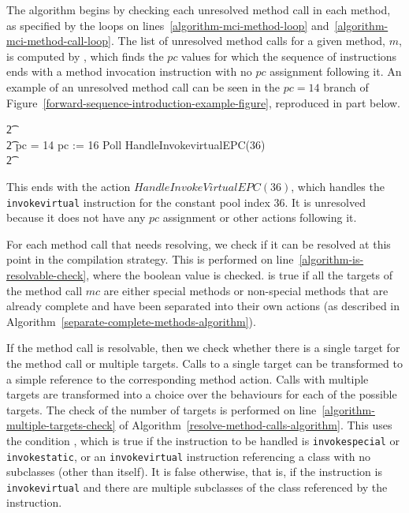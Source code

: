 The algorithm begins by checking each unresolved method call in each
method, as specified by the loops on
lines~\ref{algorithm-mci-method-loop}
and~\ref{algorithm-mci-method-call-loop}.
The list of unresolved method calls for a given method, $m$, is
computed by , which finds the $pc$
values for which the sequence of instructions ends with a method
invocation instruction with no $pc$ assignment following it.
An example of an unresolved method call can be seen in the $pc = 14$
branch of Figure~\ref{forward-sequence-introduction-example-figure},
reproduced in part below.
\begin{circusaction}
  \t2 {} \cdots {} \\
  \t2 {} \circelse pc = 14 \circthen \cdots \circseq pc := 16 \circseq Poll \circseq HandleInvokevirtualEPC(36) \\
  \t2 {} \cdots {}
\end{circusaction}
This ends with the action $HandleInvokeVirtualEPC(36)$, which handles
the \texttt{invokevirtual} instruction for the constant pool index
$36$.
It is unresolved because it does not have any $pc$ assignment or other
actions following it.

For each method call that needs resolving, we check if it can be
resolved at this point in the compilation strategy.
This is performed on line~\ref{algorithm-is-resolvable-check}, where
the boolean value  is checked.
 is true if all the targets of the method
call $mc$ are either special methods or non-special methods that are
already complete and have been separated into their own actions (as
described in Algorithm~\ref{separate-complete-methods-algorithm}).

If the method call is resolvable, then we check whether there is a
single target for the method call or multiple targets.
Calls to a single target can be transformed to a simple reference to
the corresponding method action.
Calls with multiple targets are transformed into a choice over the
behaviours for each of the possible targets.
The check of the number of targets is performed on
line~\ref{algorithm-multiple-targets-check} of
Algorithm~\ref{resolve-method-calls-algorithm}.
This uses the condition , which is true if
the instruction to be handled is \texttt{invokespecial} or
\texttt{invokestatic}, or an \texttt{invokevirtual} instruction
referencing a class with no subclasses (other than itself).
It is false otherwise, that is, if the instruction is
\texttt{invokevirtual} and there are multiple subclasses of the class
referenced by the instruction.

